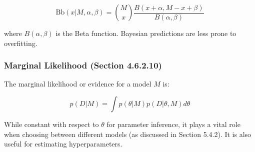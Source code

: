 \documentclass{article}
\begin{document}
$$
\text{Bb}(x|M, \alpha, \beta) = \binom{M}{x} \frac{B(x + \alpha, M - x + \beta)}{B(\alpha, \beta)}
$$

where $B(\alpha, \beta)$ is the Beta function. Bayesian predictions are less prone to overfitting.

\subsubsection{Marginal Likelihood (Section 4.6.2.10)}

The marginal likelihood or evidence for a model $M$ is:

$$
p(D|M) = \int p(\theta|M)p(D|\theta, M)d\theta
$$

While constant with respect to $\theta$ for parameter inference, it plays a vital role when choosing between different models (as discussed in Section 5.4.2). It is also useful for estimating hyperparameters.
\end{document}
